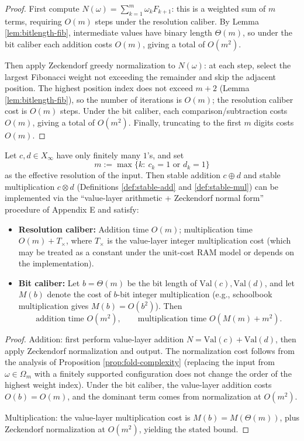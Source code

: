 \begin{proof}
First compute $N(\omega)=\sum_{k=1}^m \omega_k F_{k+1}$: this is a weighted sum of $m$ terms, requiring $O(m)$ steps under the resolution caliber. By Lemma \ref{lem:bitlength-fib}, intermediate values have binary length $\Theta(m)$, so under the bit caliber each addition costs $O(m)$, giving a total of $O(m^2)$.

Then apply Zeckendorf greedy normalization to $N(\omega)$: at each step, select the largest Fibonacci weight not exceeding the remainder and skip the adjacent position. The highest position index does not exceed $m+2$ (Lemma \ref{lem:bitlength-fib}), so the number of iterations is $O(m)$; the resolution caliber cost is $O(m)$ steps. Under the bit caliber, each comparison/subtraction costs $O(m)$, giving a total of $O(m^2)$. Finally, truncating to the first $m$ digits costs $O(m)$.
\end{proof}

\begin{proposition}\label{prop:stable-arith-complexity}
Let $c,d\in X_\infty$ have only finitely many $1$'s, and set
\[
m:=\max\{k:\ c_k=1\text{ or } d_k=1\}
\]
as the effective resolution of the input. Then stable addition $c\oplus d$ and stable multiplication $c\otimes d$ (Definitions \ref{def:stable-add} and \ref{def:stable-mul}) can be implemented via the ``value-layer arithmetic + Zeckendorf normal form'' procedure of Appendix E and satisfy:
\begin{itemize}
  \item \textbf{Resolution caliber:} Addition time $O(m)$; multiplication time $O(m)+T_\times$, where $T_\times$ is the value-layer integer multiplication cost (which may be treated as a constant under the unit-cost RAM model or depends on the implementation).
  \item \textbf{Bit caliber:} Let $b=\Theta(m)$ be the bit length of $\mathrm{Val}(c),\mathrm{Val}(d)$, and let $M(b)$ denote the cost of $b$-bit integer multiplication (e.g., schoolbook multiplication gives $M(b)=O(b^2)$). Then
  \[
  \text{addition time }O(m^2),\qquad
  \text{multiplication time }O(M(m)+m^2).
  \]
\end{itemize}
\end{proposition}

\begin{proof}
Addition: first perform value-layer addition $N=\mathrm{Val}(c)+\mathrm{Val}(d)$, then apply Zeckendorf normalization and output. The normalization cost follows from the analysis of Proposition \ref{prop:fold-complexity} (replacing the input from $\omega\in\Omega_m$ with a finitely supported configuration does not change the order of the highest weight index). Under the bit caliber, the value-layer addition costs $O(b)=O(m)$, and the dominant term comes from normalization at $O(m^2)$.

Multiplication: the value-layer multiplication cost is $M(b)=M(\Theta(m))$, plus Zeckendorf normalization at $O(m^2)$, yielding the stated bound.
\end{proof}
